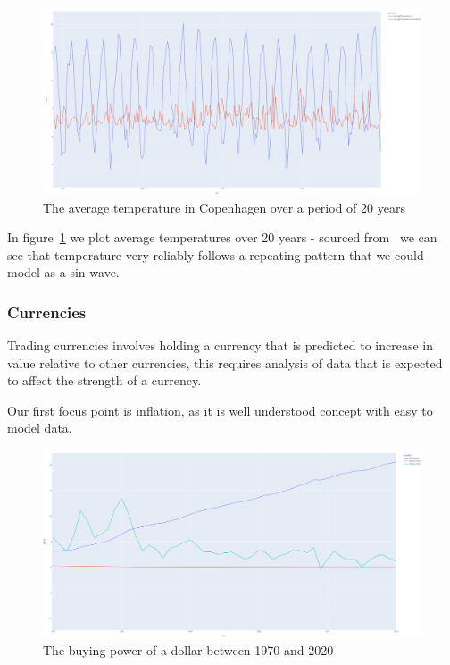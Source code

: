 \begin{figure}[H]
    \centering
    \includegraphics[width=12cm]{figures/real_data_examples/cph_average_temp}
    \caption{The average temperature in Copenhagen over a period of 20 years}
    \label{fig:real_data_climate_cph}
\end{figure}

In figure~\ref{fig:real_data_climate_cph} we plot average temperatures over 20 years - sourced from~\cite{KaggleTemperature}
we can see that temperature very reliably follows a repeating pattern that we could model as a sin wave.

\subsubsection{Currencies}

Trading currencies involves holding a currency that is predicted to increase in value relative to other currencies,
this requires analysis of data that is expected to affect the strength of a currency.

Our first focus point is inflation, as it is well understood concept with easy to model data.

\begin{figure}[H]
    \centering
    \includegraphics[width=12cm]{figures/real_data_examples/dollar_value_statistics}
    \caption{The buying power of a dollar between 1970 and 2020}
    \label{fig:real_data_inflation}
\end{figure}

